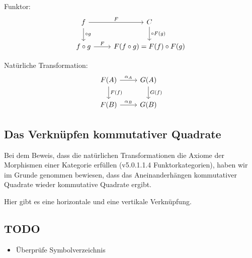 \documentclass[a4paper]{amsart}
\theoremstyle{definition}
\begin{document}
Funktor:
\begin{equation}
    \begin{tikzcd}
        f   \arrow[d, "\circ g"]  \arrow[r, "F"] & C \arrow[d, "\circ F(g)"]\\
        f \circ g                   \arrow[r, "F"] & F(f \circ g) = F(f) \circ F(g)
    \end{tikzcd}
\end{equation}

Natürliche Transformation:
\begin{equation}
    \begin{tikzcd}
        F(A)   \arrow[d, "F(f)"]  \arrow[r, "\alpha_A"] & G(A) \arrow[d, "G(f)"]\\
        F(B)                      \arrow[r, "\alpha_B"] & G(B)
    \end{tikzcd}
\end{equation}

\subsection{Das Verknüpfen kommutativer Quadrate}
Bei dem Beweis, dass die natürlichen Transformationen die Axiome der Morphismen einer Kategorie erfüllen (v5.0.1.1.4 Funktorkategorien), haben wir im Grunde genommen bewiesen, dass das Aneinanderhängen kommutativer Quadrate wieder kommutative Quadrate ergibt.

Hier gibt es eine horizontale und eine vertikale Verknüpfung.

\begin{backup}
\section{TODO}

\begin{itemize}
     \item Überprüfe Symbolverzeichnis
\end{itemize}

\end{backup}
\end{document}
